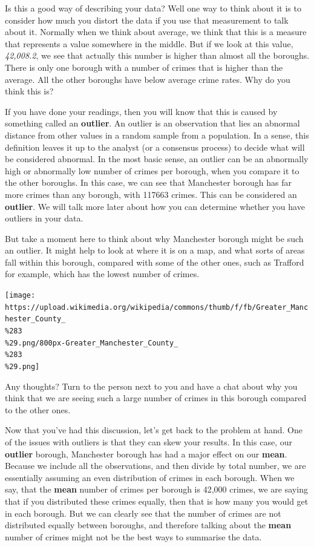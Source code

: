 \documentclass[
]{book}
\begin{document}
Is this a good way of describing your data? Well one way to think about it is to consider how much you distort the data if you use that measurement to talk about it. Normally when we think about average, we think that this is a measure that represents a value somewhere in the middle. But if we look at this value, \emph{42,008.2}, we see that actually this number is higher than almost all the boroughs. There is only one borough with a number of crimes that is higher than the average. All the other boroughs have below average crime rates. Why do you think this is?

If you have done your readings, then you will know that this is caused by something called an \textbf{outlier}. An outlier is an observation that lies an abnormal distance from other values in a random sample from a population. In a sense, this definition leaves it up to the analyst (or a consensus process) to decide what will be considered abnormal. In the most basic sense, an outlier can be an abnormally high or abnormally low number of crimes per borough, when you compare it to the other boroughs. In this case, we can see that Manchester borough has far more crimes than any borough, with 117663 crimes. This can be considered an \textbf{outlier}. We will talk more later about how you can determine whether you have outliers in your data.

But take a moment here to think about why Manchester borough might be such an outlier. It might help to look at where it is on a map, and what sorts of areas fall within this borough, compared with some of the other ones, such as Trafford for example, which has the lowest number of crimes.

\texttt{[image: https://upload.wikimedia.org/wikipedia/commons/thumb/f/fb/Greater\_Manchester\_County\_\\\%283\\\%29.png/800px-Greater\_Manchester\_County\_\\\%283\\\%29.png]}

Any thoughts? Turn to the person next to you and have a chat about why you think that we are seeing such a large number of crimes in this borough compared to the other ones.

Now that you've had this discussion, let's get back to the problem at hand. One of the issues with outliers is that they can skew your results. In this case, our \textbf{outlier} borough, Manchester borough has had a major effect on our \textbf{mean}. Because we include all the observations, and then divide by total number, we are essentially assuming an even distribution of crimes in each borough. When we say, that the \textbf{mean} number of crimes per borough is 42,000 crimes, we are saying that if you distributed these crimes equally, then that is how many you would get in each borough. But we can clearly see that the number of crimes are not distributed equally between boroughs, and therefore talking about the \textbf{mean} number of crimes might not be the best ways to summarise the data.
\end{document}
